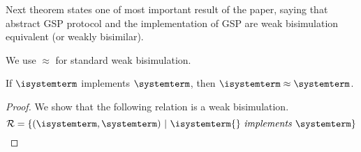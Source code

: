 Next theorem states one of most important result of the paper, saying that abstract GSP protocol and the implementation of GSP are weak bisimulation equivalent (or weakly bisimilar).

We use $\approx$ for standard weak bisimulation.

\begin{theorem} If  $\isystemterm$ implements $\systemterm$, then $\isystemterm\approx\systemterm$. 
\end{theorem}



\begin{proof} We show that the following relation is a weak bisimulation.
\[
\mathcal{R} = \{ (\isystemterm, \systemterm) \ |\ \implements{\isystemterm{}}{\systemterm} \}
\]





\end{proof}
